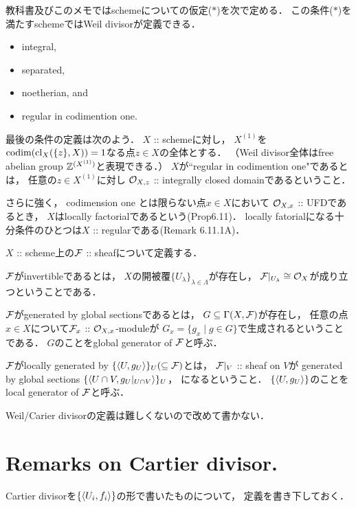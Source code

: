 \documentclass[a4paper]{jsarticle}
\begin{document}
\begin{Def}
    教科書及びこのメモではschemeについての仮定($*$)を次で定める．
    この条件($*$)を満たすschemeではWeil divisorが定義できる．
    \begin{itemize}
        \item integral,
        \item separated,
        \item noetherian, and
        \item regular in codimention one.
    \end{itemize}

    最後の条件の定義は次のよう．
    $X$ :: schemeに対し，
    $X^{(1)}$を$\operatorname{codim}(\operatorname{cl}_X(\{z\},X))=1$なる点$z \in X$の全体とする．
    （Weil divisor全体はfree abelian group $\mathbb{Z}^{(X^{(1)})}$と表現できる．）
    $X$が``regular in codimention one"であるとは，
    任意の$z \in X^{(1)}$に対し
    $\mathcal{O}_{X,z}$ :: integrally closed domainであるということ．

    さらに強く，
    codimension one とは限らない点$x \in X$において
    $\mathcal{O}_{X,x}$ :: UFDであるとき，
    $X$はlocally factorialであるという(Prop6.11)．
    locally fatorialになる十分条件のひとつは$X$ :: regularである(Remark 6.11.1A)．
\end{Def}

\begin{Def}
    $X$ :: scheme上の$\mathcal{F}$ :: sheafについて定義する．
    
    $\mathcal{F}$がinvertibleであるとは，
    $X$の開被覆$\{ U_{\lambda} \}_{\lambda \in \Lambda}$が存在し，
    $\mathcal{F}|_{U_{\lambda}} \cong \mathcal{O}_X$が成り立つということである．

    $\mathcal{F}$がgenerated by global sectionsであるとは，
    $G \subseteq \Gamma(X,\mathcal{F})$が存在し，
    任意の点$x \in X$について$\mathcal{F}_x$ :: $\mathcal{O}_{X,x}$-moduleが
    $G_x=\{ g_x \mid g \in G \}$で生成されるということである．
    $G$のことをglobal generator of $\mathcal{F}$と呼ぶ．

    $\mathcal{F}$がlocally generated by $\{\langle U,g_U \rangle\}_U (\subseteq \mathcal{F})$とは，
    $\mathcal{F}|_V$ :: sheaf on $V$が
    generated by global sections $\{\langle U \cap V,g_U|_{U \cap V} \rangle\}_U$，
    になるということ．
    $\{\langle U,g_U \rangle\}$のことをlocal generator of $\mathcal{F}$と呼ぶ．
\end{Def}

    Weil/Carier divisorの定義は難しくないので改めて書かない．

\section{Remarks on Cartier divisor.}
    Cartier divisorを$\{\langle U_i,f_i \rangle\}$の形で書いたものについて，
    定義を書き下しておく．
\end{document}
